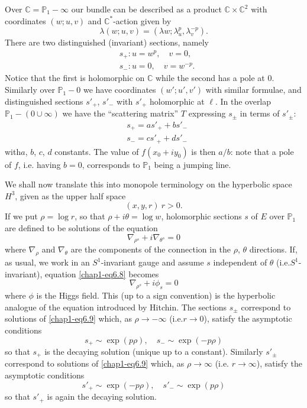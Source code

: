 Over $\mathbb{C}=\mathbb{P}_{1}-\infty$ our bundle can be described as
a product $\mathbb{C}\times \mathbb{C}^{2}$ with coordinates $(w;u,v)$
and $\mathbb{C}^{*}$-action given by 
$$
\lambda(w;u,v)=(\lambda w;\lambda^{p}_{u},\lambda^{-p}_{v}).
$$
There are two distinguished (invariant) sections, namely
\begin{align*}
& s_{+}:u=w^{p},\quad v=0,\\
& s_{-}:u=0,\quad v=w^{-p}.
\end{align*}
Notice that the first is holomorphic on $\mathbb{C}$ while the second
has a pole at $0$. Similarly over $\mathbb{P}_{1}-0$ we have
coordinates $(w';u',v')$ with similar formulae, and distinguished
sections $s'_{+}$, $s'_{-}$ with $s'_{+}$ holomorphic at $\ell$. In
the overlap $\mathbb{P}_{1}-(0\cup \infty)$ we have the ``scattering
matrix'' $T$ expressing $s_{\pm}$ in terms of $s'_{\pm}$:
\begin{align*}
& s_{+}=as'_{+}+bs'_{-}\\[3pt]
& s_{-}=cs'_{+}+ds'_{-}
\end{align*}
with\pageoriginale $a$, $b$, $c$, $d$ constants. The value of
$f(x_{0}+iy_{0})$ is then $a/b$: note that a pole of $f$, i.e. having
$b=0$, corresponds to $\mathbb{P}_{1}$ being a jumping line. 

We shall now translate this into monopole terminology on the
hyperbolic space $H^{3}$, given as the upper half space
\begin{equation}
(x,y,r)~r>0.\label{chap1-eq6.7}
\end{equation}
If we put $\rho=\log r$, so that $\rho+i\theta=\log w$, holomorphic
sections $s$ of $E$ over $\mathbb{P}_{1}$ are defined to be solutions
of the equation
\begin{equation}
\nabla_{\rho^{s}}+i\nabla_{\theta^{s}}=0\label{chap1-eq6.8}
\end{equation}
where $\nabla_{\rho}$ and $\nabla_{\theta}$ are the components of the
connection in the $\rho$, $\theta$ directions. If, as usual, we work
in an $S^{1}$-invariant gauge and assume $s$ independent of $\theta$
(i.e.\@ $S^{1}$-invariant), equation \eqref{chap1-eq6.8} becomes
\begin{equation}
\nabla_{\rho^{s}}+i\phi_{s}=0\label{chap1-eq6.9}
\end{equation}
where $\phi$ is the Higgs field. This (up to a sign convention) is the
hyperbolic analogue of the equation introduced by Hitchin. The
sections $s_{\pm}$ correspond to solutions of \eqref{chap1-eq6.9}
which, as $\rho\to -\infty$ (i.e.\@ $r\to 0$), satisfy the asymptotic
conditions 
$$
s_{+}\sim \exp (p\rho),\quad s_{-}\sim \exp (-p\rho)
$$
so that $s_{+}$ is the decaying solution (unique up to a
constant). Similarly $s'_{\pm}$ correspond to solutions
of \eqref{chap1-eq6.9} which, as $\rho\to \infty$ (i.e.\@
$r\to\infty$), satisfy the asymptotic conditions
$$
s'_{+}\sim \exp (-p\rho),\quad s'_{-}\sim \exp (p\rho)
$$
so that $s'_{+}$ is again the decaying solution.

